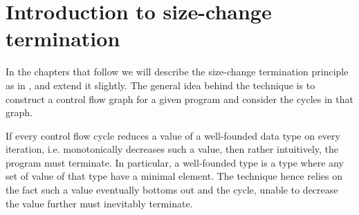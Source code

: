 \section{Introduction to size-change termination}

In the chapters that follow we will describe the size-change termination
principle as in \cite{size-change}, and extend it slightly. The general idea
behind the technique is to construct a control flow graph for a given program
and consider the cycles in that graph.

If every control flow cycle reduces a value of a well-founded data type on
every iteration, i.e. monotonically decreases such a value, then rather
intuitively, the program must terminate. In particular, a well-founded type is
a type where any set of value of that type have a minimal element. The
technique hence relies on the fact such a value eventually bottoms out and the
cycle, unable to decrease the value further must inevitably terminate.
